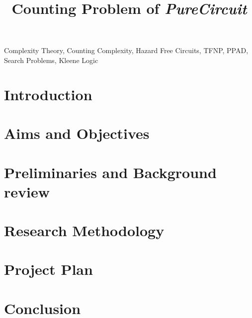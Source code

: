 \documentclass{IEEEtran}
\begin{document}
\title{Counting Problem of \textit{PureCircuit}}

\author{
}

\maketitle

\begin{abstract}

\end{abstract}

\begin{IEEEkeywords} %
    Complexity Theory, Counting Complexity, Hazard Free Circuits, TFNP, PPAD, Search Problems, Kleene Logic
\end{IEEEkeywords}

\section{Introduction}


\section{Aims and Objectives}

\section{Preliminaries and Background review}


\section{Research Methodology} 


\section{Project Plan} 


\section{Conclusion} 

    


\end{document}
